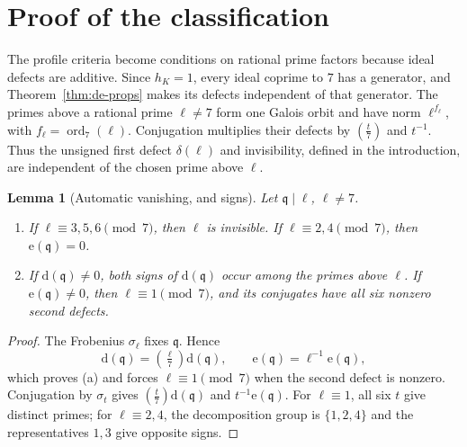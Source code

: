 \documentclass[11pt]{amsart}
\theoremstyle{plain}
\newtheorem{lemma}[theorem]{Lemma}
\theoremstyle{definition}
\numberwithin{equation}{section}
\DeclareMathOperator{\ord}{ord}
\newcommand{\qq}{\mathfrak q}
\newcommand{\dd}{\mathrm d}
\newcommand{\ee}{\mathrm e}
\begin{document}

\section{Proof of the classification}\label{sec:closed}

The profile criteria become conditions on rational prime factors
because ideal defects are additive. Since $h_K=1$, every ideal
coprime to $7$ has a generator, and Theorem~\ref{thm:de-props}
makes its defects independent of that generator.
The primes above a rational prime $\ell\ne7$ form one Galois
orbit and have norm $\ell^{f_\ell}$, with $f_\ell=\ord_7(\ell)$.
Conjugation multiplies their defects by $(\tfrac t7)$ and $t^{-1}$.
Thus the unsigned first defect $\delta(\ell)$ and invisibility,
defined in the introduction, are independent of the chosen prime
above $\ell$.

\begin{lemma}[Automatic vanishing, and signs]\label{lem:auto}
Let $\qq\mid\ell$, $\ell\ne7$.
\begin{enumerate}
\item[(a)] If $\ell\equiv3,5,6\pmod7$, then $\ell$ is invisible.
If $\ell\equiv2,4\pmod7$, then $\ee(\qq)=0$.
\item[(b)] If $\dd(\qq)\ne0$, both signs of $\dd(\qq)$ occur
among the primes above $\ell$. If $\ee(\qq)\ne0$, then
$\ell\equiv1\pmod7$, and its conjugates have all six nonzero
second defects.
\end{enumerate}
\end{lemma}

\begin{proof}
The Frobenius $\sigma_\ell$ fixes $\qq$. Hence
\[
 \dd(\qq)=(\tfrac\ell7)\dd(\qq),\qquad
 \ee(\qq)=\ell^{-1}\ee(\qq),
\]
which proves (a) and forces $\ell\equiv1\pmod7$ when the
second defect is nonzero. Conjugation by $\sigma_t$ gives
$(\tfrac t7)\dd(\qq)$ and $t^{-1}\ee(\qq)$. For
$\ell\equiv1$, all six $t$ give distinct primes; for
$\ell\equiv2,4$, the decomposition group is $\{1,2,4\}$ and
the representatives $1,3$ give opposite signs.
\end{proof}
\end{document}
